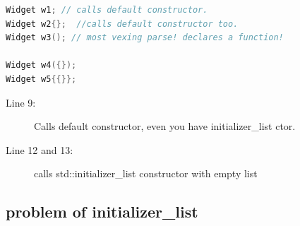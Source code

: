 \documentclass[a4paper,11pt,twoside]{book}
\begin{document}
\begin{itemize}
\begin{lstlisting}[frame=single, language=c++,mathescape=true]
Widget w1; // calls default constructor.
Widget w2{};  //calls default constructor too.
Widget w3(); // most vexing parse! declares a function!
	
Widget w4({}); 
Widget w5{{}}; 
\end{lstlisting}
\begin{description}
	\item[Line 9:] Calls default constructor, even  you have  initializer\_list ctor.
	\item[Line 12 and 13:] calls std::initializer\_list constructor with empty list
\end{description}
	
	\end{itemize}
	
\subsection{problem of initializer\_list}
	
\end{document}

